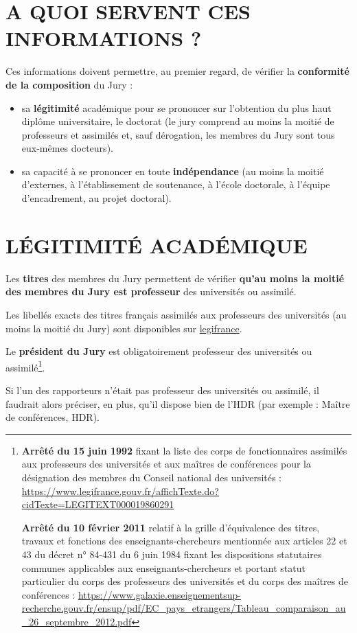 \documentclass[french,12pt,a4paper]{book}
\begin{document}
\section{A QUOI SERVENT CES INFORMATIONS ?}
Ces informations doivent permettre, au premier regard, de vérifier la \textbf{conformité de la composition} du Jury :

\begin{itemize}
\renewcommand{\labelitemi}{$\bullet$}
    \item sa \textbf{légitimité} académique pour se prononcer sur l’obtention du plus haut diplôme universitaire, le doctorat (le jury comprend au moins la moitié de professeurs et assimilés et, sauf dérogation, les membres du Jury sont tous eux-mêmes docteurs). 
    \item sa capacité à se prononcer en toute \textbf{indépendance} (au moins la moitié d’externes, à l’établissement de soutenance, à l’école doctorale, à l’équipe d’encadrement, au projet doctoral).
\end{itemize}

\section{LÉGITIMITÉ ACADÉMIQUE}
Les \textbf{titres}  des membres du Jury permettent de vérifier \textbf{qu’au moins la moitié des membres du Jury est professeur} des universités ou assimilé.\\ \par
Les libellés exacts des titres français assimilés aux professeurs des universités (au moins la moitié du Jury) sont disponibles sur \href{https://www.legifrance.gouv.fr/loda/id/LEGITEXT000019860291/}{legifrance}.\\ \par
Le \textbf{président du Jury} est obligatoirement professeur des universités ou assimilé\footnote{\textbf{Arrêté du 15 juin 1992} fixant la liste des corps de fonctionnaires assimilés aux professeurs des universités et aux maîtres de conférences pour la désignation des membres du Conseil national des universités : \url{https://www.legifrance.gouv.fr/affichTexte.do?cidTexte=LEGITEXT000019860291}\\ \par
\textbf{Arrêté du 10 février 2011} relatif à la grille d'équivalence des titres, travaux et fonctions des enseignants-chercheurs mentionnée aux articles 22 et 43 du décret n° 84-431 du 6 juin 1984 fixant les dispositions statutaires communes applicables aux enseignants-chercheurs et portant statut particulier du corps des professeurs des universités et du corps des maîtres de conférences : \url{https://www.galaxie.enseignementsup-recherche.gouv.fr/ensup/pdf/EC_pays_etrangers/Tableau_comparaison_au_26_septembre_2012.pdf}}.\\ \par
Si l’un des rapporteurs n’était pas professeur des universités ou assimilé, il faudrait alors préciser, en plus, qu’il dispose bien de l’HDR (par exemple : Maître de conférences, HDR).
\end{document}
